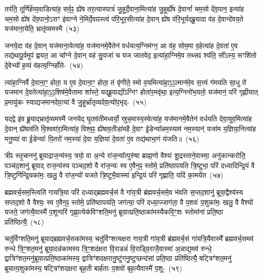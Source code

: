 तर॑ति॒ तूर्णि॑र्\mbox{}हव्य॒वाडित्या॑ह॒ सर्व॒ꣴ॒ ह्ये॑ष तर॒त्यास्पात्रं॑ जु॒हूर्दे॒वा\-ना॒\-मि\-त्या॑ह जु॒हूर्\mbox{}ह्ये॑ष दे॒वानां᳚ चम॒सो दे॑व॒पान॒ इत्या॑ह चम॒सो ह्ये॑ष दे॑व॒पानो॒\-ऽराꣳ इ॑वाग्ने ने॒मिर्दे॒वाꣴस्त्वं प॑रि॒भूर॒सीत्या॑ह दे॒वान् ह्ये॑ष प॑रि॒\-भूर्यद्ब्रू॒\-यादा व॑ह दे॒वान्दे॑वय॒ते यज॑माना॒येति॒ भ्रातृ॑व्यमस्मै~(५३)

जनये॒दा व॑ह दे॒वान् यज॑माना॒येत्या॑ह॒ यज॑मानमे॒वैतेन॑ वर्ध\-य\-त्य॒\-ग्नि\-म॑ग्न॒ आ व॑ह॒ सोम॒मा व॒हेत्या॑ह दे॒वता॑ ए॒व तद्य॑थापू॒र्वमुप॑ ह्वयत॒ आ चा᳚ग्ने दे॒वान् वह॑ सु॒यजा॑ च यज जातवेद॒ इत्या॑हा॒ग्निमे॒व तथ्सꣴ श्य॑ति॒ सो᳚\-ऽस्य॒ सꣳशि॑तो दे॒वेभ्यो॑ ह॒व्यं व॑हत्य॒ग्निर्\mbox{}होते-~(५४)

त्या॑हा॒ग्निर्वै दे॒वाना॒ꣳ॒ होता॒ य ए॒व दे॒वाना॒ꣳ॒ होता॒ तं वृ॑णीते॒ स्मो व॒यमित्या॑हा॒ऽ॒ऽ॒त्मान॑मे॒व स॒त्त्वं ग॑मयति सा॒धु ते॑ यजमान दे॒वतेत्या॑हा॒ऽ॒ऽ॒शिष॑मे॒वैतामा शा᳚स्ते॒ यद्ब्रू॒याद्यो᳚\-ऽग्निꣳ होता॑र॒मवृ॑था॒ इत्य॒ग्निनो॑भ॒यतो॒ यज॑मानं॒ परि॑ गृह्णीयात् प्र॒मायु॑कः स्याद्यजमानदेव॒त्या॑ वै जु॒हूर्भ्रा॑तृव्यदेव॒त्यो॑प॒भृद्-~(५५)

यद्द्वे इ॑व ब्रू॒याद्भ्रातृ॑व्यमस्मै जनयेद् घृ॒तव॑तीमध्वर्यो॒ स्रुच॒मास्य॒\-स्वे\-त्या॑ह॒ यज॑मानमे॒वैतेन॑ वर्धयति देवा॒युव॒मित्या॑ह दे॒वान् ह्ये॑षा\-व॑ति वि॒श्व\-वा॑रा॒मित्या॑ह॒ विश्व॒ꣴ॒ ह्ये॑षाव॒तीडा॑महै दे॒वाꣳ ई॒डेन्या᳚न्नम॒स्याम॑ नम॒स्यान्॑ यजा॑म य॒ज्ञिया॒नित्या॑ह मनु॒ष्या॑ वा ई॒डेन्याः᳚ पि॒तरो॑ नम॒स्या॑ दे॒वा य॒ज्ञिया॑ दे॒वता॑ ए॒व तद्य॑थाभा॒गं य॑जति॥~(५६)

{\anuvakamend[{विप्रा॑नुमदित॒ इत्या॑ह च॒नास्मै॒ होतो॑प॒भृद्दे॒वता॑ ए॒व त्रीणि॑ च}]}%

त्रीꣴ स्तृ॒चाननु॑ ब्रूयाद्राज॒न्य॑स्य॒ त्रयो॒ वा अ॒न्ये रा॑ज॒न्या᳚त्पुरु॑षा ब्राह्म॒णो वैश्यः॑ शू॒द्रस्ताने॒वास्मा॒ अनु॑कान्करोति॒ पञ्च॑द॒शानु॑ ब्रूयाद् राज॒न्य॑स्य पञ्चद॒शो वै रा॑ज॒न्यः॑ स्व ए॒वैन॒ꣴ॒ स्तोमे॒ प्रति॑\-ष्ठापयति त्रि॒ष्टुभा॒ परि॑ दध्यादिन्द्रि॒यं वै त्रि॒ष्टुगि॑न्द्रि॒यका॑मः॒ खलु॒ वै रा॑ज॒न्यो॑ यजते त्रि॒ष्टुभै॒वास्मा॑ इन्द्रि॒यं परि॑ गृह्णाति॒ यदि॑ का॒मये॑त~(५७)

ब्रह्मवर्च॒सम॒स्त्विति॑ गायत्रि॒या परि॑ दध्याद्ब्रह्मवर्च॒सं वै गा॑य॒त्री ब्र॑ह्मवर्च॒समे॒व भ॑वति स॒प्तद॒शानु॑ ब्रूया॒द्वैश्य॑स्य सप्तद॒शो वै वैश्यः॒ स्व ए॒वैन॒ꣴ॒ स्तोमे॒ प्रति॑\-ष्ठापयति॒ जग॑त्या॒ परि॑ दध्या॒ज्जाग॑ता॒ वै प॒शवः॑ प॒शुका॑मः॒ खलु॒ वै वैश्यो॑ यजते॒ जग॑त्यै॒वास्मै॑ प॒शून्परि॑ गृह्णा॒त्येक॑विꣳशति॒मनु॑ ब्रूयात्प्रति॒ष्ठाका॑मस्यैकवि॒ꣳ॒शः स्तोमा॑नां प्रति॒ष्ठा प्रति॑ष्ठित्यै॒~(५८)

चतु॑र्विꣳशति॒मनु॑ ब्रूयाद्ब्रह्मवर्च॒सका॑मस्य॒ चतु॑र्विꣳशत्यक्षरा गाय॒त्री गा॑य॒त्री ब्र॑ह्मवर्च॒सं गा॑यत्रि॒यैवास्मै᳚ ब्रह्मवर्च॒समव॑ रुन्धे त्रि॒ꣳ॒शत॒\-मनु॑ ब्रूया॒दन्न॑कामस्य त्रि॒ꣳ॒शद॑क्षरा वि॒राडन्नं॑ वि॒राड्वि॒रा\-जै॒\-वा\-स्मा॑ अ॒न्नाद्\-य॒\-मव॑ रुन्धे॒ द्वात्रिꣳ॑शत॒\-मनु॑\-ब्रूयात्प्र\-ति॒ष्ठा\-का॑मस्य॒ द्वात्रिꣳ॑शद\-क्षरा\-नु॒ष्टु॑ग\-नु॒ष्टुप्छन्द॑सां प्रति॒ष्ठा प्रति॑ष्ठित्यै॒ षट्त्रिꣳ॑शत॒मनु॑ ब्रूयात्प॒शुका॑मस्य॒ षट्त्रिꣳ॑शदक्षरा बृह॒ती बार्\mbox{}ह॑ताः प॒शवो॑ बृह॒त्यैवास्मै॑ प॒शू-~(५९)


